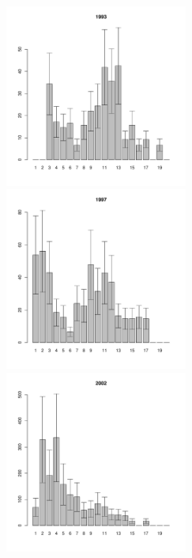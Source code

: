 \documentclass[12pt, a4paper]{article}
\begin{document}
\begin{figure}[h]
\begin{multicols}{3}
\hfill
\includegraphics[width=60mm]{../White_Sea/Luvenga_II_razrez/zostera_zone_1993_.pdf}
\hfill
\includegraphics[width=60mm]{../White_Sea/Luvenga_II_razrez/zostera_zone_1997_.pdf}
\hfill
\includegraphics[width=60mm]{../White_Sea/Luvenga_II_razrez/zostera_zone_2002_.pdf}
\end{multicols}



\end{figure}
\end{document}
